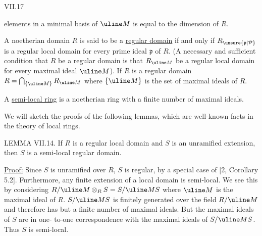 VII.17

elements in a minimal basis of $\uline M$ is equal to the dimension of $R$.

A noetherian domain $R$ is said to be a \uline{regular domain} if and
only if $R_{\unsure{\mathfrak p|\mathcal P}}$ is a regular local domain for every prime ideal $\mathfrak p$ of $R$.
(A necessary and sufficient condition that $R$ be a regular domain is
that $R_{\uline M}$ be a regular local domain for every maximal ideal $\uline M$). If
$R$ is a regular domain $R=\bigcap_{\{\uline M\}}R_{\uline M}$ where $\{\uline M\}$ is the set of
maximal ideals of $R$.

A \uline{semi-local ring} is a noetherian ring with a finite number of
maximal ideals.

We will sketch the proofs of the following lemmas, which are
well-known facts in the theory of local rings.

LEMMA VII.14. If $R$ is a regular local domain and $S$ is an
unramified extension, then $S$ is a semi-local regular domain.

\uline{Proof:} Since $S$ is unramified over $R$, $S$ is regular, by a
special case of [2, Corollary 5.2]. Furthermore, any finite
extension of a local domain is semi-local. We see this by considering
$R/\uline M\otimes_R S=S/\uline M S$ where $\uline M$ is the maximal ideal of $R$. $S/\uline M S$ is
finitely generated over the field $R/\uline M$ and therefore has but a finite
number of maximal ideals. But the maximal ideals of $S$ are in one-
to-one correspondence with the maximal ideals of $S/\uline M S$. Thus $S$
is semi-local.
